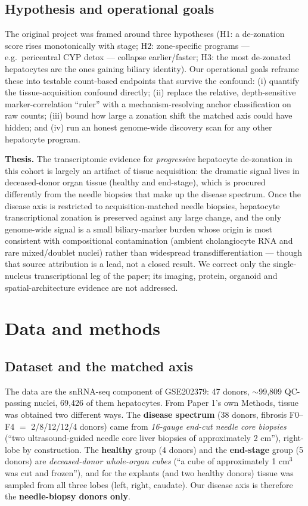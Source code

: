 \documentclass[11pt,a4paper]{article}
\begin{document}
\subsection{Hypothesis and operational goals}

The original project was framed around three hypotheses (H1: a de-zonation score rises monotonically with stage; H2: zone-specific programs --- e.g.\ pericentral CYP detox --- collapse earlier/faster; H3: the most de-zonated hepatocytes are the ones gaining biliary identity). Our operational goals reframe these into testable count-based endpoints that survive the confound: (i) quantify the tissue-acquisition confound directly; (ii) replace the relative, depth-sensitive marker-correlation ``ruler'' with a mechanism-resolving anchor classification on raw counts; (iii) bound how large a zonation shift the matched axis could have hidden; and (iv) run an honest genome-wide discovery scan for any other hepatocyte program.

\textbf{Thesis.} The transcriptomic evidence for \emph{progressive} hepatocyte de-zonation in this cohort is largely an artifact of tissue acquisition: the dramatic signal lives in deceased-donor organ tissue (healthy and end-stage), which is procured differently from the needle biopsies that make up the disease spectrum. Once the disease axis is restricted to acquisition-matched needle biopsies, hepatocyte transcriptional zonation is preserved against any large change, and the only genome-wide signal is a small biliary-marker burden whose origin is most consistent with compositional contamination (ambient cholangiocyte RNA and rare mixed/doublet nuclei) rather than widespread transdifferentiation --- though that source attribution is a lead, not a closed result. We correct only the single-nucleus transcriptional leg of the paper; its imaging, protein, organoid and spatial-architecture evidence are not addressed.

\section{Data and methods}

\subsection{Dataset and the matched axis}

The data are the snRNA-seq component of GSE202379: 47 donors, $\sim$99{,}809 QC-passing nuclei, 69{,}426 of them hepatocytes. From Paper 1's own Methods, tissue was obtained two different ways. The \textbf{disease spectrum} (38 donors, fibrosis F0--F4 $=$ 2/8/12/12/4 donors) came from \emph{16-gauge end-cut needle core biopsies} (``two ultrasound-guided needle core liver biopsies of approximately 2 cm''), right-lobe by construction. The \textbf{healthy} group (4 donors) and the \textbf{end-stage} group (5 donors) are \emph{deceased-donor whole-organ cubes} (``a cube of approximately 1 cm$^3$ was cut and frozen''), and for the explants (and two healthy donors) tissue was sampled from all three lobes (left, right, caudate). Our disease axis is therefore the \textbf{needle-biopsy donors only}.
\end{document}
